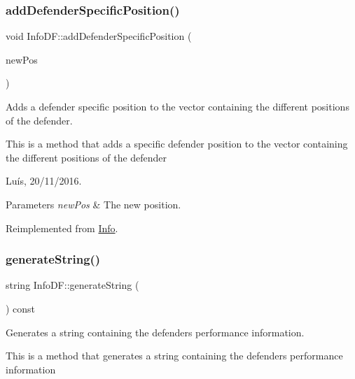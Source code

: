 \subsubsection{\texorpdfstring{add\+Defender\+Specific\+Position()}{addDefenderSpecificPosition()}}
{\footnotesize\ttfamily void Info\+D\+F\+::add\+Defender\+Specific\+Position (\begin{DoxyParamCaption}\item[{\hyperlink{_utils_8hpp_a94ee089ecd5db12c81c7edbefaabff4d}{Defender\+Position}}]{new\+Pos }\end{DoxyParamCaption})\hspace{0.3cm}{\ttfamily [virtual]}}



Adds a defender specific position to the vector containing the different positions of the defender. 

This is a method that adds a specific defender position to the vector containing the different positions of the defender

Luís, 20/11/2016. 


\begin{DoxyParams}{Parameters}
{\em new\+Pos} & The new position. \\
\hline
\end{DoxyParams}


Reimplemented from \hyperlink{class_info_a33d98f07e5a276f9a3d0a08275f559b3}{Info}.

\hypertarget{class_info_d_f_a036c0f0898331e092f913da788b7ccdb}{}\label{class_info_d_f_a036c0f0898331e092f913da788b7ccdb} 
\subsubsection{\texorpdfstring{generate\+String()}{generateString()}}
{\footnotesize\ttfamily string Info\+D\+F\+::generate\+String (\begin{DoxyParamCaption}{ }\end{DoxyParamCaption}) const\hspace{0.3cm}{\ttfamily [virtual]}}



Generates a string containing the defender\textquotesingle{}s performance information. 

This is a method that generates a string containing the defender\textquotesingle{}s performance information

